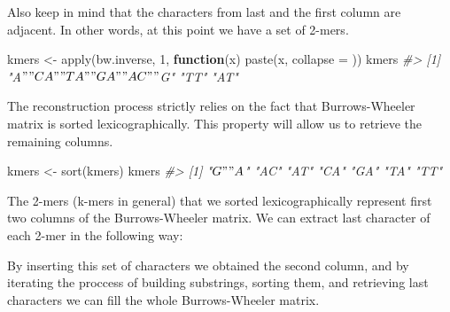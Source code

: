 \documentclass[
]{book}
\newenvironment{Shaded}{\begin{snugshade}}{\end{snugshade}}
\newcommand{\AttributeTok}[1]{\textcolor[rgb]{0.77,0.63,0.00}{#1}}
\newcommand{\CommentTok}[1]{\textcolor[rgb]{0.56,0.35,0.01}{\textit{#1}}}
\newcommand{\ConstantTok}[1]{\textcolor[rgb]{0.00,0.00,0.00}{#1}}
\newcommand{\ControlFlowTok}[1]{\textcolor[rgb]{0.13,0.29,0.53}{\textbf{#1}}}
\newcommand{\DecValTok}[1]{\textcolor[rgb]{0.00,0.00,0.81}{#1}}
\newcommand{\FunctionTok}[1]{\textcolor[rgb]{0.00,0.00,0.00}{#1}}
\newcommand{\NormalTok}[1]{#1}
\newcommand{\OtherTok}[1]{\textcolor[rgb]{0.56,0.35,0.01}{#1}}
\newcommand{\StringTok}[1]{\textcolor[rgb]{0.31,0.60,0.02}{#1}}
\begin{document}
Also keep in mind that the characters from last and the first column are adjacent. In other words, at this point we have a set of 2-mers.

\begin{Shaded}
\begin{Highlighting}[numbers=left,,]
\NormalTok{kmers }\OtherTok{\textless{}{-}} \FunctionTok{apply}\NormalTok{(bw.inverse, }\DecValTok{1}\NormalTok{, }
               \ControlFlowTok{function}\NormalTok{(x) }\FunctionTok{paste}\NormalTok{(x, }\AttributeTok{collapse =} \StringTok{\textquotesingle{}\textquotesingle{}}\NormalTok{))}
\NormalTok{kmers}
\CommentTok{\#\textgreater{} [1] "A$" "CA" "TA" "GA" "AC" "$G" "TT" "AT"}
\end{Highlighting}
\end{Shaded}

The reconstruction process strictly relies on the fact that Burrows-Wheeler matrix is sorted lexicographically. This property will allow us to retrieve the remaining columns.

\begin{Shaded}
\begin{Highlighting}[numbers=left,,]
\NormalTok{kmers }\OtherTok{\textless{}{-}} \FunctionTok{sort}\NormalTok{(kmers)}
\NormalTok{kmers}
\CommentTok{\#\textgreater{} [1] "$G" "A$" "AC" "AT" "CA" "GA" "TA" "TT"}
\end{Highlighting}
\end{Shaded}

The 2-mers (k-mers in general) that we sorted lexicographically represent first two columns of the Burrows-Wheeler matrix. We can extract last character of each 2-mer in the following way:

\begin{Shaded}
\end{Shaded}

By inserting this set of characters we obtained the second column, and by iterating the proccess of building substrings, sorting them, and retrieving last characters we can fill the whole Burrows-Wheeler matrix.
\end{document}

